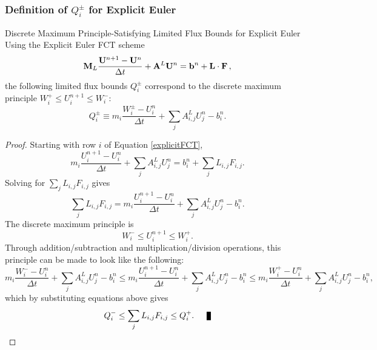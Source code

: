 \subsubsection{Definition of $Q_i^\pm$ for Explicit Euler}
\begin{theorem}{Discrete Maximum Principle-Satisfying Limited Flux Bounds for
  Explicit Euler}
   Using the Explicit Euler FCT scheme
   \begin{equation}\label{explicitFCT}
      \mathbf{M}_L\frac{\mathbf{U}^{n+1}-\mathbf{U}^n}{\Delta t}
         + \mathbf{A}^L\mathbf{U}^n
         = \mathbf{b}^n + \mathbf{L}\cdot\mathbf{F} \,,
   \end{equation}
   the following limited flux bounds $Q_i^\pm$ correspond to the discrete
   maximum principle $W_i^+\le U_i^{n+1}\le W_i^-$:
   \begin{equation}\label{Q_ex}
      Q_i^\pm \equiv m_i\frac{W_i^\pm-U_i^n}{\Delta t}
      + \sum\limits_j A_{i,j}^L U_j^n - b_i^n.
   \end{equation}
\end{theorem}

\begin{proof}
   Starting with row $i$ of Equation \eqref{explicitFCT},
   \[
      m_i\frac{U_i^{n+1}-U_i^n}{\Delta t}
      + \sum\limits_j A_{i,j}^L U_j^n
      = b_i^n + \sum\limits_j L_{i,j}F_{i,j}.
   \]
   Solving for $\sum\limits_j L_{i,j}F_{i,j}$ gives
   \[
      \sum\limits_j L_{i,j}F_{i,j} =
      m_i\frac{U_i^{n+1}-U_i^n}{\Delta t}
      + \sum\limits_j A_{i,j}^L U_j^n
      - b_i^n.
   \]
   The discrete maximum principle is
   \[
      W_i^-\le U_i^{n+1}\le W_i^+.
   \]
   Through addition/subtraction and multiplication/division operations, this
   principle can be made to look like the following:
   \[
   m_i\frac{W_i^- -U_i^n}{\Delta t}
      + \sum\limits_j A_{i,j}^L U_j^n
      - b_i^n
   \le m_i\frac{U_i^{n+1}-U_i^n}{\Delta t}
      + \sum\limits_j A_{i,j}^L U_j^n
      - b_i^n
   \le m_i\frac{W_i^+ -U_i^n}{\Delta t}
      + \sum\limits_j A_{i,j}^L U_j^n
      - b_i^n,
   \]
   which by substituting equations above gives
   \[
      Q_i^-\le\sum\limits_j L_{i,j}F_{i,j}\le Q_i^+.\qed
   \]
\end{proof}
